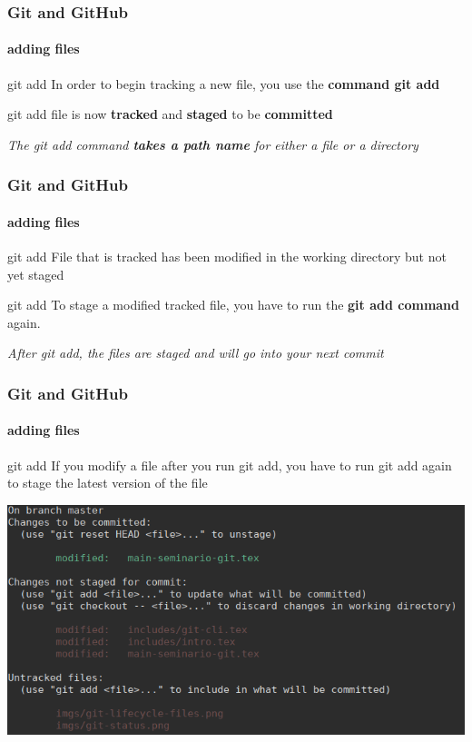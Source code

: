 \begin{frame}
	\frametitle{Git and GitHub}
    \framesubtitle{adding files}
    \addtocounter{nframe}{1}


	\begin{block}{git add}
		In order to begin tracking a new file, you use the \textbf{command git add}
	\end{block}

	\begin{block}{git add}
		file is now \textbf{tracked} and \textbf{staged} to be \textbf{committed}
	\end{block}

	\textit{The git add command \textbf{takes a path name} for either a file or a directory}
	

\end{frame}

\begin{frame}
	\frametitle{Git and GitHub}
    \framesubtitle{adding files}
    \addtocounter{nframe}{1}


	\begin{block}{git add}
		File that is tracked has been modified in the working directory but not yet staged
	\end{block}

	\begin{block}{git add}
		To stage a modified tracked file, you have to run the \textbf{git add command} again.
	\end{block}
	
	\textit{After git add, the files are staged and will go into your next commit}	

\end{frame}

\begin{frame}
	\frametitle{Git and GitHub}
    \framesubtitle{adding files}
    \addtocounter{nframe}{1}


	\begin{block}{git add}
		If you modify a file after you run git add, you have to run git add again to stage the latest version of the file
	\end{block}

	\begin{center}
		\includegraphics[width=.8\textwidth]{imgs/git-add-modify.png}
	\end{center}

\end{frame}

